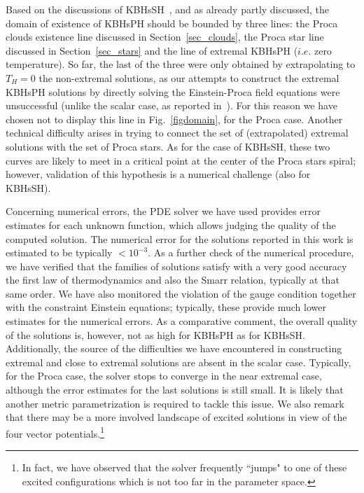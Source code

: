 Based on the discussions of KBHsSH~\cite{Herdeiro:2014goa,Herdeiro:2015gia,Herdeiro:2015tia}, and as already partly discussed, the domain of existence of KBHsPH should be bounded by three lines: the Proca clouds existence line discussed in Section~\ref{sec_clouds}, the Proca star line discussed in Section~\ref{sec_stars} and the line of extremal KBHsPH ($i.e.$ zero temperature). So far, the last of the three were only obtained by extrapolating to $T_H=0$ the non-extremal solutions, as our attempts to construct the extremal KBHsPH solutions by directly solving the Einstein-Proca field equations were unsuccessful (unlike the scalar case, as reported in~\cite{Herdeiro:2015gia}). For this reason we have chosen not to display this line in Fig.~\ref{figdomain}, for the Proca case.  Another technical difficulty arises in trying to connect the set of (extrapolated) extremal solutions with the set of Proca stars. As for the case of KBHsSH, these two curves are likely to meet in a critical point at the center of the 
Proca stars spiral; however, validation of this hypothesis is a numerical challenge (also for KBHsSH).

Concerning numerical errors, the PDE solver we have used provides error estimates for each unknown function, which allows judging the quality of the computed solution. The numerical error for the solutions reported in
this work is estimated to be typically $<10^{-3}$. As a further check of the numerical procedure, we have verified that the families of solutions  satisfy with a very good accuracy the first law of thermodynamics and also the Smarr relation, typically at that same order. We have also monitored the violation of the gauge condition together with the constraint Einstein equations; typically, these provide much lower estimates for the numerical errors. As a comparative comment, the overall quality of the solutions is, however,  not as high for KBHsPH as for KBHsSH.
Additionally, the source of the difficulties we have encountered in constructing extremal and close to extremal solutions are absent in the scalar case. Typically, for the Proca case, the solver stops to converge in the near extremal case,
 although the error estimates for the last solutions is still small. It is likely that another metric parametrization is required to tackle this issue. We also remark that  there may be a more involved landscape of excited solutions in view of the four vector potentials.\footnote{ 
In fact, we have observed that the solver frequently ``jumps"  to one of these excited configurations 
which is not too far in the parameter space.}

